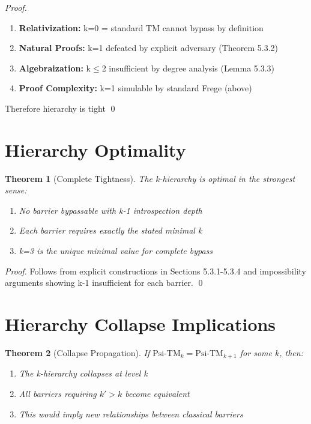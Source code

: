 \documentclass[11pt]{article}
\newtheorem{theorem}{Theorem}[section]
\theoremstyle{definition}
\begin{document}
\begin{proof}
\begin{enumerate}
\item \textbf{Relativization:} k=0 = standard TM cannot bypass by definition
\item \textbf{Natural Proofs:} k=1 defeated by explicit adversary (Theorem 5.3.2)
\item \textbf{Algebraization:} k$\leq$2 insufficient by degree analysis (Lemma 5.3.3)
\item \textbf{Proof Complexity:} k=1 simulable by standard Frege (above)
\end{enumerate}
Therefore hierarchy is tight \qed
\end{proof}

\section{Hierarchy Optimality}
\begin{theorem}[Complete Tightness]
The k-hierarchy is optimal in the strongest sense:
\begin{enumerate}
\item No barrier bypassable with k-1 introspection depth
\item Each barrier requires exactly the stated minimal k
\item k=3 is the unique minimal value for complete bypass
\end{enumerate}
\end{theorem}
\begin{proof}
Follows from explicit constructions in Sections 5.3.1-5.3.4 and 
impossibility arguments showing k-1 insufficient for each barrier. \qed
\end{proof}

\section{Hierarchy Collapse Implications}

\begin{theorem}[Collapse Propagation]
If $\text{Psi-TM}_k = \text{Psi-TM}_{k+1}$ for some $k$, then:
\begin{enumerate}
\item The k-hierarchy collapses at level k
\item All barriers requiring $k' > k$ become equivalent
\item This would imply new relationships between classical barriers
\end{enumerate}
\end{theorem}
\end{document}
